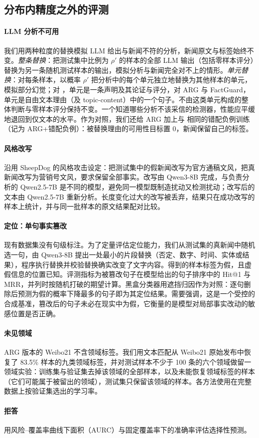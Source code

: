 \subsection{分布内精度之外的评测}\label{sec:robust-sets}

\paragraph{LLM 分析不可用}
我们用两种粒度的替换模拟 LLM 给出与新闻不符的分析，新闻原文与标签始终不变。\emph{整条替换}：把测试集中比例为 $\rho'$ 的样本的全部 LLM 输出（包括零样本评分）替换为另一条随机测试样本的输出，模拟分析与新闻完全对不上的情形。\emph{单元替换}：对每条样本，以概率 $\rho'$ 把分析中的每个单元独立地替换为其他样本的单元，模拟部分幻觉；对 \method{}，单元是一条声明及其论证与评分，对 ARG 与 FactGuard，单元是自由文本理由（及 topic-content）中的一个句子。不由这类单元构成的整体判断与零样本评分保持不变。一个知道哪些分析不该采信的检测器，性能应平缓地退回到仅文本的水平。作为对照，我们还给 ARG 加上与 \method{} 相同的错配负例训练（记为 ARG+错配负例）：被替换理由的可用性目标置 0，新闻保留自己的标签。

\paragraph{风格改写}
沿用 SheepDog\citep{wu2024sheepdog} 的风格攻击设定：把测试集中的假新闻改写为官方通稿文风，把真新闻改写为营销号文风，要求保留全部事实。改写由 Qwen3-8B\citep{qwen3} 完成，与负责分析的 Qwen2.5-7B 是不同的模型，避免同一模型既制造扰动又检测扰动；改写后的文本由 Qwen2.5-7B 重新分析。长度变化过大的改写被丢弃，结果只在成功改写的样本上统计，并与同一批样本的原文结果配对比较。

\paragraph{定位：单句事实篡改}
现有数据集没有句级标注。为了定量评估定位能力，我们从测试集的真新闻中随机选一句，由 Qwen3-8B 提出一处最小的片段替换（否定、数字、时间、实体或结果），程序执行替换并校验替换确实改变了文字内容。得到的样本标签为假，且虚假信息的位置已知。评测指标为被篡改句子在模型给出的句子排序中的 Hit@1 与 MRR，并列时按随机打破的期望计算。黑盒分类器用遮挡归因\citep{li2016understanding}作为对照：逐句删除后预测为假的概率下降最多的句子即为其定位结果。需要强调，这是一个受控的合成基准，篡改后的句子未必在现实中为假，它衡量的是模型对局部事实改动的敏感位置是否正确。

\paragraph{未见领域}
ARG 版本的 Weibo21 不含领域标签。我们用文本匹配从 Weibo21 原始发布中恢复了 83.5\% 样本的九类领域标签，并对测试样本不少于 100 条的六个领域做留一领域实验：训练集与验证集去掉该领域的全部样本，以及未能恢复领域标签的样本（它们可能属于被留出的领域），测试集只保留该领域的样本。各方法使用在完整数据上按验证集选出的学习率。

\paragraph{拒答}
用风险--覆盖率曲线下面积（AURC）\citep{geifman2019bias}与固定覆盖率下的准确率评估选择性预测。
